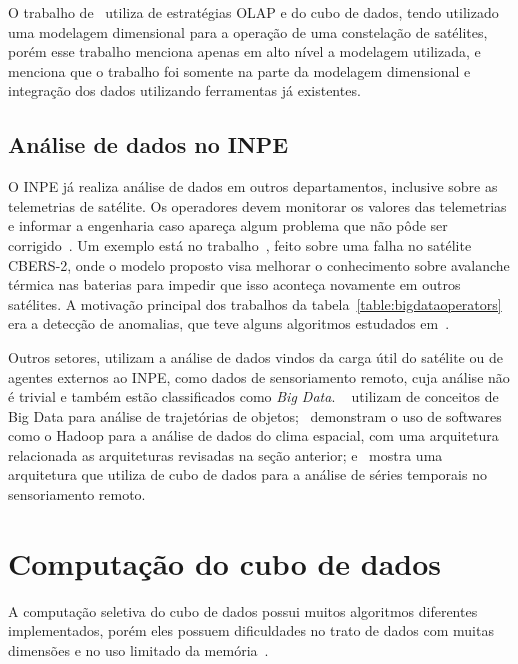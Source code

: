 O trabalho de~\cite{yvernesCopernicusGroundSegment2018} utiliza de estratégias OLAP e do cubo de dados, tendo utilizado uma modelagem dimensional para a operação de uma constelação de satélites, porém esse trabalho menciona apenas em alto nível a modelagem utilizada, e menciona que o trabalho foi somente na parte da modelagem dimensional e integração dos dados utilizando ferramentas já existentes.

\subsection{Análise de dados no INPE}\label{ch:corr:inpe}

O INPE já realiza análise de dados em outros departamentos, inclusive sobre as telemetrias de satélite.
Os operadores devem monitorar os valores das telemetrias e informar a engenharia caso apareça algum problema que não pôde ser corrigido~\cite{TominagaFerrAmbr:2017:CoSaTe}.
Um exemplo está no trabalho~\cite{Magalhaes:2012:EsAvTe}, feito sobre uma falha no satélite CBERS-2, onde o modelo proposto visa melhorar o conhecimento sobre avalanche térmica nas baterias para impedir que isso aconteça novamente em outros satélites.
A motivação principal dos trabalhos da tabela~\ref{table:bigdataoperators} era a detecção de anomalias, que teve alguns algoritmos estudados em~\cite{AzevedoAmbrViei::EsSoTe}.

Outros setores, utilizam a análise de dados vindos da carga útil do satélite ou de agentes externos ao INPE, como dados de sensoriamento remoto, cuja análise não é trivial e também estão classificados como \textit{Big Data}.
~ utilizam de conceitos de Big Data para análise de trajetórias de objetos;~ demonstram o uso de softwares como o Hadoop para a análise de dados do clima espacial, com uma arquitetura relacionada as arquiteturas revisadas na seção anterior; e~ mostra uma arquitetura que utiliza de cubo de dados para a análise de séries temporais no sensoriamento remoto.

\section{Computação do cubo de dados}\label{ch:corr:cube}

A computação seletiva do cubo de dados possui muitos algoritmos diferentes implementados, porém eles possuem dificuldades no trato de dados com muitas dimensões e no uso limitado da memória~\cite{hanDataMiningConcepts2011}.

